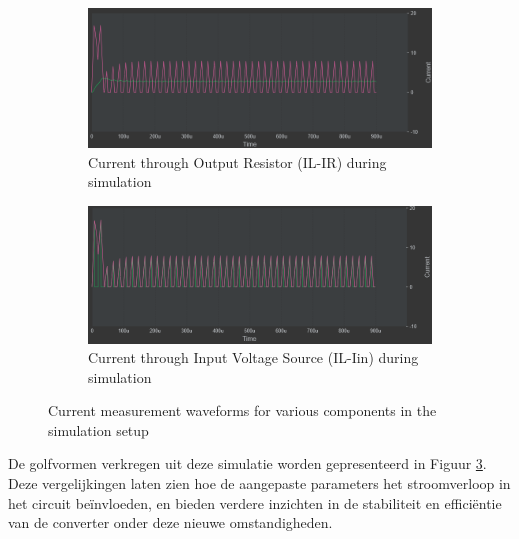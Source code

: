 \begin{figure}[h!]
    \begin{subfigure}{0.45\linewidth}
        \centering
        \includegraphics[width=\linewidth]{img/hfd2/IL-IR-7.png}
        \caption{Current through Output Resistor (IL-IR) during simulation}
        \label{fig:IL-IR-7}
    \end{subfigure}
    \begin{subfigure}{0.45\linewidth}
        \centering
        \includegraphics[width=\linewidth]{img/hfd2/IL-Lin-7.png}
        \caption{Current through Input Voltage Source (IL-Iin) during simulation}
        \label{fig:IL-Lin-7}
    \end{subfigure}
    
    \caption{Current measurement waveforms for various components in the simulation setup}
    \label{fig:adjusted_waveforms2}
\end{figure}
De golfvormen verkregen uit deze simulatie worden gepresenteerd in Figuur \ref{fig:adjusted_waveforms2}. Deze vergelijkingen laten zien hoe de aangepaste parameters het stroomverloop in het circuit beïnvloeden, en bieden verdere inzichten in de stabiliteit en efficiëntie van de converter onder deze nieuwe omstandigheden.